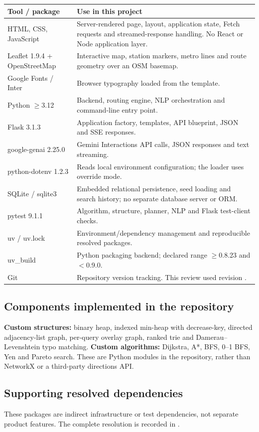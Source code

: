 \documentclass[10pt,a4paper]{article}
\newcommand{\code}[1]{\texttt{\small\detokenize{#1}}}
\begin{document}
\begin{tabularx}{\linewidth}{@{}p{4.7cm} X@{}}
\toprule
\textbf{Tool / package} & \textbf{Use in this project}\\\midrule
HTML, CSS, JavaScript & Server-rendered page, layout, application state, Fetch requests and streamed-response handling. No React or Node application layer.\\
Leaflet 1.9.4 + OpenStreetMap & Interactive map, station markers, metro lines and route geometry over an OSM basemap.\\
Google Fonts / Inter & Browser typography loaded from the template.\\
Python $\geq$3.12 & Backend, routing engine, NLP orchestration and command-line entry point.\\
Flask 3.1.3 & Application factory, templates, API blueprint, JSON and SSE responses.\\
google-genai 2.25.0 & Gemini Interactions API calls, JSON responses and text streaming.\\
python-dotenv 1.2.3 & Reads local environment configuration; the loader uses override mode.\\
SQLite / sqlite3 & Embedded relational persistence, seed loading and search history; no separate database server or ORM.\\
pytest 9.1.1 & Algorithm, structure, planner, NLP and Flask test-client checks.\\
uv / uv.lock & Environment/dependency management and reproducible resolved packages.\\
uv\_build & Python packaging backend; declared range $\geq$0.8.23 and $<$0.9.0.\\
Git & Repository version tracking. This review used revision \code{f9c8ee0}.\\\bottomrule
\end{tabularx}

\subsection{Components implemented in the repository}
\textbf{Custom structures:} binary heap, indexed min-heap with decrease-key, directed adjacency-list graph, per-query overlay graph, ranked trie and Damerau--Levenshtein typo matching. \textbf{Custom algorithms:} Dijkstra, A*, BFS, 0--1 BFS, Yen and Pareto search. These are Python modules in the repository, rather than NetworkX or a third-party directions API.

\subsection{Supporting resolved dependencies}
These packages are indirect infrastructure or test dependencies, not separate product features. The complete resolution is recorded in \code{uv.lock}.
\end{document}

